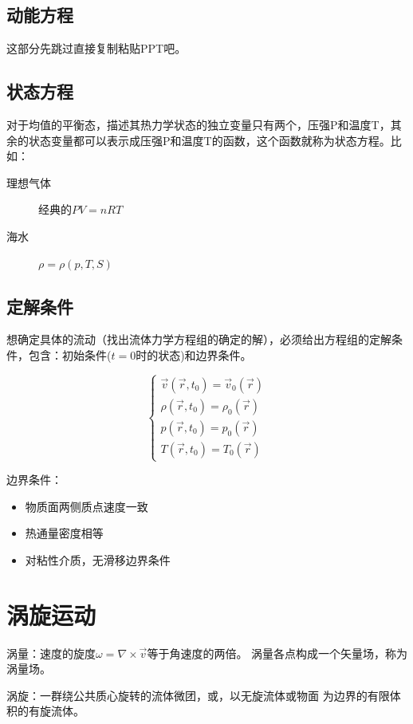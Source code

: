 \documentclass[UTF8,12pt]{article}
\begin{document}
\subsection{动能方程}
这部分先跳过直接复制粘贴PPT吧。

\subsection{状态方程}

对于均值的平衡态，描述其热力学状态的独立变量只有两个，压强P和温度T，其余的状态变量都可以表示成压强P和温度T的函数，这个函数就称为状态方程。比如：
\begin{description}
    \item[理想气体] 经典的$PV= nRT$
    \item[海水] $\rho = \rho(p,T,S)$
\end{description}

\subsection{定解条件}

想确定具体的流动（找出流体力学方程组的确定的解），必须给出方程组的定解条件，包含：初始条件($t=0$时的状态)和边界条件。

\[
\begin{cases}
  \vec v(\vec r,t_0) = \vec v_0(\vec r) \\ 
  \rho(\vec r,t_0) = \rho_0(\vec r) \\ 
  p(\vec r,t_0)  = p_0(\vec r) \\ 
  T(\vec r,t_0) = T_0(\vec r)
\end{cases}
\]

边界条件：
\begin{itemize}
    \item 物质面两侧质点速度一致
    \item 热通量密度相等
    \item 对粘性介质，无滑移边界条件
\end{itemize} 

\section{涡旋运动}

涡量：速度的旋度$\omega = \nabla \times \vec v$等于角速度的两倍。
涡量各点构成一个矢量场，称为涡量场。

涡旋：一群绕公共质心旋转的流体微团，或，以无旋流体或物面
为边界的有限体积的有旋流体。
\end{document}
